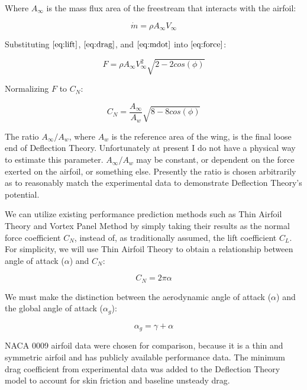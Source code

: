 Where \(A_\infty\) is the mass flux area of the freestream that interacts with the airfoil:

\begin{equation}
\label{eq:mdot}
    \dot{m} = \rho A_\infty V_\infty
\end{equation}

Substituting \(\eqref{eq:lift}\), \(\eqref{eq:drag}\), and \(\eqref{eq:mdot}\) into \(\eqref{eq:force}\):

\begin{equation}
    F = \rho A_\infty V_\infty^2 \sqrt{2 - 2 cos(\phi)}
\end{equation}

Normalizing \(F\) to \(C_N\):

\begin{equation}
    C_N = \frac{A_\infty} {A_w} \sqrt{8 - 8 cos(\phi)}
\end{equation}

The ratio \(A_\infty / A_w\), where \(A_w\) is the reference area of the wing, is the final loose end of Deflection Theory. Unfortunately at present I do not have a physical way to estimate this parameter.
\(A_\infty / A_w\) may be constant, or dependent on the force exerted on the airfoil, or something else.
Presently the ratio is chosen arbitrarily as to reasonably match the experimental data to demonstrate Deflection Theory's potential.

We can utilize existing performance prediction methods such as Thin Airfoil Theory and Vortex Panel Method by simply taking their results as the normal force coefficient \(C_N\), instead of, as traditionally assumed, the lift coefficient \(C_L\). For simplicity, we will use Thin Airfoil Theory to obtain a relationship between angle of attack (\(\alpha\)) and \(C_N\):

\begin{equation}
    C_N = 2 \pi \alpha
\end{equation}

We must make the distinction between the aerodynamic angle of attack (\(\alpha\)) and the global angle of attack (\(\alpha_g\)):

\begin{equation}
    \alpha_g = \gamma + \alpha
\end{equation}

NACA 0009 airfoil data were chosen for comparison, because it is a thin and symmetric airfoil and has publicly available performance data. The minimum drag coefficient from experimental data was added to the Deflection Theory model to account for skin friction and baseline unsteady drag.

